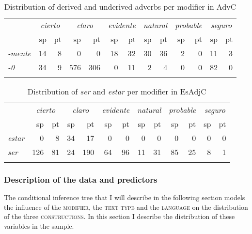 \begin{table}

\begin{tabular}{lrrrrrrrrrrrr}
\lsptoprule
& \multicolumn{2}{c}{\itshape cierto} & \multicolumn{2}{c}{\itshape claro}& \multicolumn{2}{c}{\itshape evidente} & \multicolumn{2}{c}{\itshape natural} & \multicolumn{2}{c}{\itshape probable} & \multicolumn{2}{c}{\itshape seguro} \\\cmidrule(lr){2-3}\cmidrule(lr){4-5}\cmidrule(lr){6-7}\cmidrule(lr){8-9}\cmidrule(lr){10-11}\cmidrule(lr){12-13}
& sp & pt & sp & pt &sp & pt &sp & pt &sp & pt &sp & pt \\\midrule 
		\textit{-mente} &  14 & 8 &  0&0  & 18&  32 &   30  &   36 &   2&   0&   11&   3 \\ 
		\textit{-0} &34&9  &576 & 306 &0 &      11  & 2 &   4 & 0 &     0&82&    0\\
\lspbottomrule
	\end{tabular}
	\caption{Distribution of derived and underived adverbs per modifier in AdvC\label{tab:corpusmente}}
\end{table}
                        
\begin{table}
\begin{tabular}{lrrrrrrrrrrrr}
\lsptoprule 
& \multicolumn{2}{c}{\itshape cierto} & \multicolumn{2}{c}{\itshape claro}& \multicolumn{2}{c}{\itshape evidente} & \multicolumn{2}{c}{\itshape natural} & \multicolumn{2}{c}{\itshape probable} & \multicolumn{2}{c}{\itshape seguro} \\\cmidrule(lr){2-3}\cmidrule(lr){4-5}\cmidrule(lr){6-7}\cmidrule(lr){8-9}\cmidrule(lr){10-11}\cmidrule(lr){12-13}
	& sp & pt & sp & pt &sp & pt &sp & pt &sp & pt &sp & pt \\
\midrule 
		\textit{estar} &  0& 8 &  34&17 & 0&  0 &   0 &   0 &   0&   0&   0&   0 \\ 
		\textit{ser} &126&81  &24 & 190 &64 &      96  & 11 &    31  & 85&     25 & 8&     1\\
\lspbottomrule
	\end{tabular}
\caption{Distribution of \textit{ser} and \textit{estar} per modifier in EsAdjC\label{tab:corpusserestar}}
\end{table}

\subsubsection{Description of the data and  predictors}
The conditional inference tree that I will describe in the following section models the influence of the \textsc{modifier}, the \textsc{\textsc{text type}} and the \textsc{language} on the distribution of the three \textsc{constructions}. In this section I describe the distribution of these variables in the sample.

